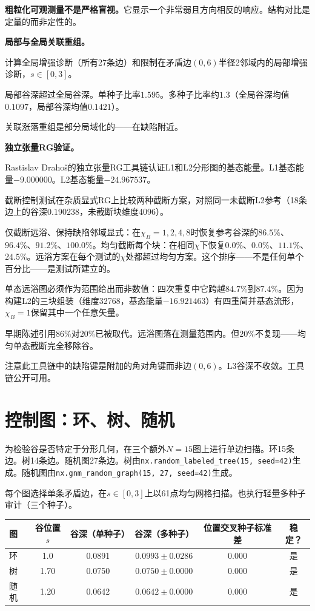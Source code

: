 \documentclass[11pt,a4paper]{book}
\theoremstyle{definition}
\begin{document}
\textbf{粗粒化可观测量不是严格盲视。}它显示一个非常弱且方向相反的响应。结构对比是定量的而非定性的。

\textbf{局部与全局关联重组。}

计算全局增强诊断（所有27条边）和限制在矛盾边$(0,6)$半径2邻域内的局部增强诊断，$s\in[0,3]$。

局部谷深超过全局谷深。单种子比率$1.595$。多种子比率约$1.3$（全局谷深均值$0.1097$，局部谷深均值$0.1421$）。

关联涨落重组是部分局域化的——在缺陷附近。

\textbf{独立张量RG验证。}

Rastislav Drahoš的独立张量RG工具链认证L1和L2分形图的基态能量。L1基态能量$-9.000000$。L2基态能量$-24.967537$。

截断控制测试在杂质显式RG上比较两种截断方案，对照同一未截断L2参考（18条边上的谷深$0.190238$，未截断块维度4096）。

仅截断远浴、保持缺陷邻域显式：在$\chi_B=1,2,4,8$时恢复参考谷深的$86.5\%$、$96.4\%$、$91.2\%$、$100.0\%$。均匀截断每个块：在相同$\chi$下恢复$0.0\%$、$0.0\%$、$11.1\%$、$24.5\%$。远浴方案在每个测试的$\chi$处都超过均匀方案。这个排序——不是任何单个百分比——是测试所建立的。

单态远浴图必须作为范围给出而非数值：四次重复中它跨越$84.7\%$到$87.4\%$。因为构建L2的三块组装（维度32768，基态能量$-16.921463$）有四重简并基态流形，$\chi_B=1$保留其中一个任意矢量。

早期陈述引用$86\%$对$20\%$已被取代。远浴图落在测量范围内。但$20\%$不复现——均匀单态截断完全移除谷。

注意此工具链中的缺陷键是附加的角对角键而非边$(0,6)$。L3谷深不收敛。工具链公开可用。

\section{控制图：环、树、随机}

为检验谷是否特定于分形几何，在三个额外$N=15$图上进行单边扫描。环15条边。树14条边。随机图27条边。树由\texttt{nx.random\_labeled\_tree(15, seed=42)}生成。随机图由\texttt{nx.gnm\_random\_graph(15, 27, seed=42)}生成。

每个图选择单条矛盾边，在$s\in[0,3]$上以61点均匀网格扫描。也执行轻量多种子审计（三个种子）。

\begin{table}[h]
\centering
\begin{tabular}{lccccc}
\toprule
图 & 谷位置$s$ & 谷深（单种子） & 谷深（多种子） & 位置交叉种子标准差 & 稳定？ \\
\midrule
环 & 1.0 & 0.0891 & $0.0993\pm0.0286$ & 0.000 & 是 \\
树 & 1.70 & 0.0750 & $0.0750\pm0.0000$ & 0.000 & 是 \\
随机 & 1.20 & 0.0642 & $0.0642\pm0.0000$ & 0.000 & 是 \\
\bottomrule
\end{tabular}
\end{table}
\end{document}
